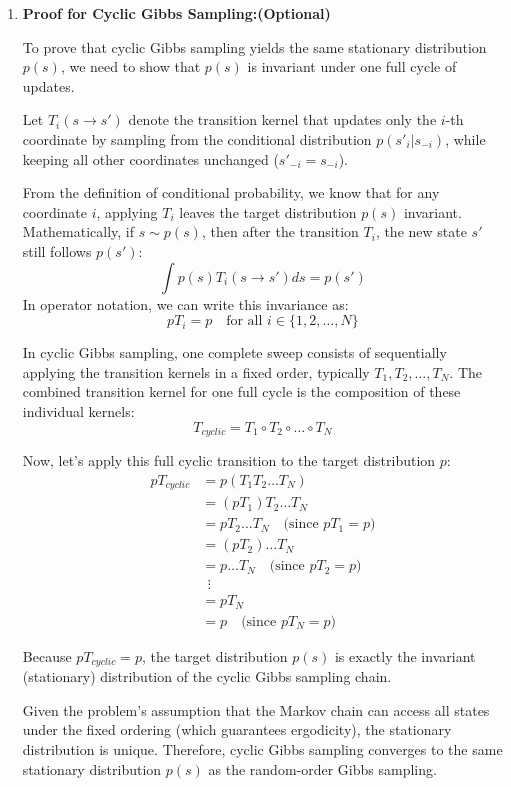 \documentclass{article}
\begin{document}
{\begin{enumerate}
    \item \textbf{Proof for Cyclic Gibbs Sampling:(Optional)}
        
        To prove that cyclic Gibbs sampling yields the same stationary distribution $p(s)$, we need to show that $p(s)$ is invariant under one full cycle of updates.
        
        Let $T_i(s \to s')$ denote the transition kernel that updates only the $i$-th coordinate by sampling from the conditional distribution $p(s'_i | s_{-i})$, while keeping all other coordinates unchanged ($s'_{-i} = s_{-i}$).
        
        From the definition of conditional probability, we know that for any coordinate $i$, applying $T_i$ leaves the target distribution $p(s)$ invariant. Mathematically, if $s \sim p(s)$, then after the transition $T_i$, the new state $s'$ still follows $p(s')$:
        \[ \int p(s) T_i(s \to s') ds = p(s') \]
        In operator notation, we can write this invariance as:
        \[ p T_i = p \quad \text{for all } i \in \{1, 2, \dots, N\} \]
        
        In cyclic Gibbs sampling, one complete sweep consists of sequentially applying the transition kernels in a fixed order, typically $T_1, T_2, \dots, T_N$. The combined transition kernel for one full cycle is the composition of these individual kernels:
        \[ T_{cyclic} = T_1 \circ T_2 \circ \dots \circ T_N \]
        
        Now, let's apply this full cyclic transition to the target distribution $p$:
        \begin{align*}
            p T_{cyclic} &= p (T_1 T_2 \dots T_N) \\
            &= (p T_1) T_2 \dots T_N \\
            &= p T_2 \dots T_N \quad \text{(since $p T_1 = p$)} \\
            &= (p T_2) \dots T_N \\
            &= p \dots T_N \quad \text{(since $p T_2 = p$)} \\
            &\ \ \vdots \\
            &= p T_N \\
            &= p \quad \text{(since $p T_N = p$)}
        \end{align*}
        
        Because $p T_{cyclic} = p$, the target distribution $p(s)$ is exactly the invariant (stationary) distribution of the cyclic Gibbs sampling chain. 
        
        Given the problem's assumption that the Markov chain can access all states under the fixed ordering (which guarantees ergodicity), the stationary distribution is unique. Therefore, cyclic Gibbs sampling converges to the same stationary distribution $p(s)$ as the random-order Gibbs sampling.
    \end{enumerate}
}
\end{document}
